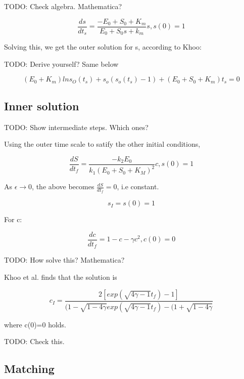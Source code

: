 \documentclass[12pt]{article}
\begin{document}
TODO: Check algebra. Mathematica?

\begin{equation}
\frac{ds}{dt_s} = \frac{-E_0 + S_0 + K_m}{E_0 + S_0s + k_m}s, s(0) = 1
\end{equation}

Solving this, we get the outer solution for s, according to Khoo:

TODO: Derive yourself? Same below

\begin{equation}
(E_0 + K_m) ln s_O(t_s) + s_o(s_o(t_s) - 1) + (E_0 + S_0 + K_m) t_s = 0
\end{equation}

\subsection{Inner solution}

TODO: Show intermediate steps. Which ones?

Using the outer time scale to satify the other initial conditions,

\begin{equation}
\frac{dS}{dt_f} = \frac{-k_2 E_0}{k_1(E_0 + S_0 + K_M)^2} c, s(0) = 1
\end{equation}

As $\epsilon \to 0$, the above becomes $\frac{dS}{dt_f} = 0$, i.e constant.

\begin{equation}
s_I = s(0) = 1
\end{equation}

For c:

\begin{equation}
\frac{dc}{dt_f} = 1 - c - \gamma c^2, c(0)=0
\end{equation}

TODO: How solve this? Mathematica?

Khoo et al. finds that the solution is

\begin{equation}
c_I = \frac{2[exp(\sqrt{4\gamma-1}t_f)-1]}{(1-\sqrt{1-4\gamma}
exp(\sqrt{4\gamma-1}t_f) - (1+\sqrt{1-4\gamma}}
\end{equation}

where c(0)=0 holds.

TODO: Check this.

\subsection{Matching}
\end{document}
